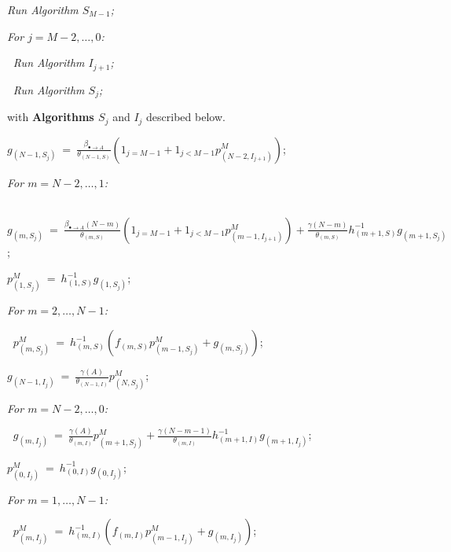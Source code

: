 \documentclass[preprint,12pt]{elsarticle}
\begin{document}
\begin{description}
  \item \it Run Algorithm $S_{M-1}$;
  \item \it For $j=M-2,\dots,0$:
  \item $~$\hspace{0.5cm} \it Run Algorithm $I_{j+1}$;
  \item $~$\hspace{0.5cm} \it Run Algorithm $S_{j}$;
\end{description}

\par\noindent with {\bf Algorithms $S_j$} and $I_j$ described below.\\

\par {}
\begin{description}
  \item $g_{(N-1,S_j)} ~=~ \frac{\beta_{\bullet\rightarrow A}}{\theta_{(N-1,S)}}\left(1_{j=M-1}+1_{j<M-1}p^M_{(N-2,I_{j+1})}\right)$;
  \item \it For $m=N-2,\dots,1$:
  \item $~$\hspace{0.5cm} $g_{(m,S_j)} ~=~ \frac{\beta_{\bullet\rightarrow A}(N-m)}{\theta_{(m,S)}}\left(1_{j=M-1}+1_{j<M-1}p^M_{(m-1,I_{j+1})}\right)+\frac{\gamma(N-m)}{\theta_{(m,S)}}h_{(m+1,S)}^{-1}g_{(m+1,S_j)}$;
  \item $p^M_{(1,S_j)} ~=~ h_{(1,S)}^{-1}g_{(1,S_j)}$;
  \item \it For $m=2,\dots,N-1$:
  \item $~$\hspace{0.5cm} $p^M_{(m,S_j)} ~=~ h_{(m,S)}^{-1}\left(f_{(m,S)}p^M_{(m-1,S_j)}+g_{(m,S_j)}\right)$;
\end{description}

\vspace{0.5cm}
\par {}
\begin{description}
  \item $g_{(N-1,I_j)} ~=~ \frac{\gamma(A)}{\theta_{(N-1,I)}}p^M_{(N,S_{j})}$;
  \item \it For $m=N-2,\dots,0$:
  \item $~$\hspace{0.5cm} $g_{(m,I_j)} ~=~ \frac{\gamma(A)}{\theta_{(m,I)}}p^M_{(m+1,S_j)}+\frac{\gamma(N-m-1)}{\theta_{(m,I)}}h_{(m+1,I)}^{-1}g_{(m+1,I_j)}$;
  \item $p^M_{(0,I_j)} ~=~ h_{(0,I)}^{-1}g_{(0,I_j)}$;
  \item \it For $m=1,\dots,N-1$:
  \item $~$\hspace{0.5cm} $p^M_{(m,I_j)} ~=~ h_{(m,I)}^{-1}\left(f_{(m,I)}p^M_{(m-1,I_j)}+g_{(m,I_j)}\right)$;
\end{description}
\end{document}

